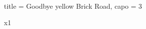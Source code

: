 \begin{multicols}{2}
\begin{song}{title = Goodbye yellow Brick Road, capo = 3}
\begin{chorus}
x1
\end{chorus}

\end{song}

\columnbreak

\chordBb
\chordC
\chordD
\\ ~ \\

\chordA
\chordBm
\chordG
\\ ~ \\

\chordACsharp
\chordBmA
\chordGA
\\ ~ \\

\chordEm
\chordF
\chordGm
\\ ~ \\

\chordAseven
\chordFsharpseven
\chordBseven
\\ ~ \\

\chordFsharp

\vfill \hfill {}

\end{multicols}
